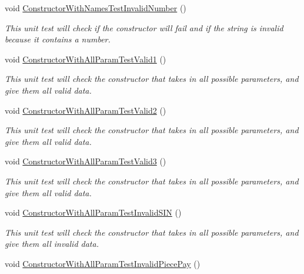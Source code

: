 \begin{DoxyCompactItemize}
void \hyperlink{class_my_all_employee_1_1_tests_1_1_seasonal_employee_tests_abfa23c08ce68040bcae1e242fc0f5975}{Constructor\+With\+Names\+Test\+Invalid\+Number} ()
\begin{DoxyCompactList}\small\item\em This unit test will check if the constructor will fail and if the string is invalid because it contains a number. \end{DoxyCompactList}\item 
void \hyperlink{class_my_all_employee_1_1_tests_1_1_seasonal_employee_tests_a8826a44d6b6503ac9aabee48ce9608a1}{Constructor\+With\+All\+Param\+Test\+Valid1} ()
\begin{DoxyCompactList}\small\item\em This unit test will check the constructor that takes in all possible parameters, and give them all valid data. \end{DoxyCompactList}\item 
void \hyperlink{class_my_all_employee_1_1_tests_1_1_seasonal_employee_tests_a3f861b922051a6e01c3ec63d757fb85a}{Constructor\+With\+All\+Param\+Test\+Valid2} ()
\begin{DoxyCompactList}\small\item\em This unit test will check the constructor that takes in all possible parameters, and give them all valid data. \end{DoxyCompactList}\item 
void \hyperlink{class_my_all_employee_1_1_tests_1_1_seasonal_employee_tests_af230c1fb248f1a3df7c71149cce6ab80}{Constructor\+With\+All\+Param\+Test\+Valid3} ()
\begin{DoxyCompactList}\small\item\em This unit test will check the constructor that takes in all possible parameters, and give them all valid data. \end{DoxyCompactList}\item 
void \hyperlink{class_my_all_employee_1_1_tests_1_1_seasonal_employee_tests_a65d59f8372d3ceea5eb45168dfb61aed}{Constructor\+With\+All\+Param\+Test\+Invalid\+S\+I\+N} ()
\begin{DoxyCompactList}\small\item\em This unit test will check the constructor that takes in all possible parameters, and give them all invalid data. \end{DoxyCompactList}\item 
void \hyperlink{class_my_all_employee_1_1_tests_1_1_seasonal_employee_tests_add552af166838e9aa1f0c3f2f58b50ae}{Constructor\+With\+All\+Param\+Test\+Invalid\+Piece\+Pay} ()

\end{DoxyCompactItemize}
